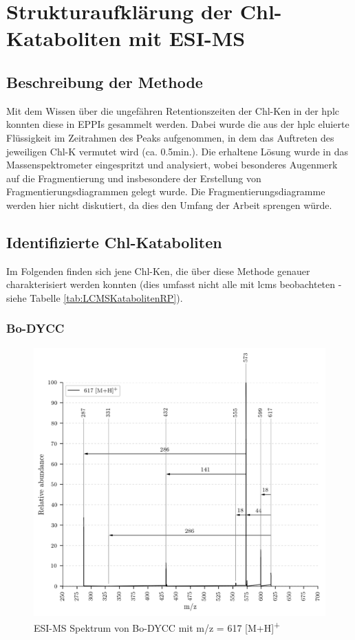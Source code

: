 \chapter{Strukturaufklärung der Chl-Kataboliten mit ESI-MS} \label{sec:ChlKatabolitenESIMS}

\section{Beschreibung der Methode}

Mit dem Wissen über die ungefähren Retentionszeiten der \gls{Chl-K}en in der \gls{hplc} konnten diese in EPPIs gesammelt werden. Dabei wurde die aus der \gls{hplc} eluierte Flüssigkeit im Zeitrahmen des Peaks aufgenommen, in dem das Auftreten des jeweiligen \gls{Chl-K} vermutet wird (ca. 0.5min.). Die erhaltene Lösung wurde in das Massenspektrometer eingespritzt und analysiert, wobei besonderes Augenmerk auf die Fragmentierung und insbesondere der Erstellung von Fragmentierungsdiagrammen gelegt wurde. Die Fragmentierungsdiagramme werden hier nicht diskutiert, da dies den Umfang der Arbeit sprengen würde. 

\section{Identifizierte Chl-Kataboliten}

Im Folgenden finden sich jene \gls{Chl-K}en, die über diese Methode genauer charakterisiert werden konnten (dies umfasst nicht alle mit \gls{lcms} beobachteten - siehe Tabelle \ref{tab:LCMSKatabolitenRP}). 

\subsection{Bo-DYCC}

\begin{figure}[!htbp]
  \centering
  \includegraphics[width=\textwidth, height=0.6\textwidth]{figures/Kapitel7/Kataboliten/VWA_MS_617.png}
  \caption[ESI-MS Spektrum von Bo-DYCC, Quelle: Autor]{ESI-MS Spektrum von Bo-DYCC mit m/z = 617 [M+H]\textsuperscript{+}}
  \label{fig:617MH}
\end{figure}

